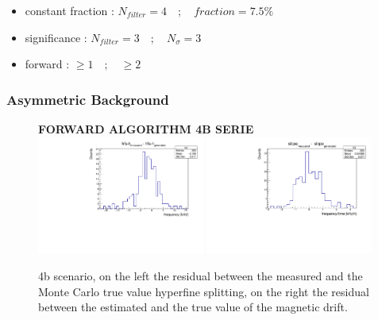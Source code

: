 \documentclass[11pt,a4paper,oneside]{article}
\begin{document}
\begin{itemize}
\item constant fraction : $N_{filter} = 4 \quad ; \quad fraction = 7.5\%$ 
\item significance : $N_{filter} = 3 \quad ; \quad N_{\sigma} = 3$
\item forward : $\geq 1 \quad ; \quad \geq 2 $
\end{itemize}

\subsubsection{Asymmetric Background}
\begin{figure}[hbtp]
\centering
\textbf{FORWARD ALGORITHM 4B SERIE} \vspace{10pt}\\
\includegraphics[width = 0.49\textwidth]{forward/4bmuonONresgasON.pdf}
\includegraphics[width = 0.49\textwidth]{forward/4bmuonONresgasON_slope.pdf}
\caption{4b scenario, on the left the residual between the measured and the Monte Carlo true value hyperfine splitting, on the right the residual between the estimated and the true value of the magnetic drift.}
\end{figure}
\end{document}
